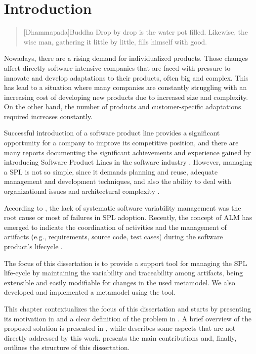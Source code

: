 \chapter{Introduction}
\label{ch:introduction}

\begin{quotation}[Dhammapada]{Buddha}
Drop by drop is the water pot filled. Likewise, the wise man, gathering it little by little, fills himself with good.
\end{quotation}

Nowadays, there are a rising demand for individualized products. Those changes affect directly software-intensive companies that are faced with pressure to innovate and develop adaptations to their products, often big and complex. This has lead to a situation where many companies are constantly struggling with an increasing cost of developing new products due to increased size and complexity. On the other hand, the number of products and customer-specific adaptations required increases constantly. \citep{rafael2013systems}

Successful introduction of a software product line provides a significant opportunity for a company to improve its competitive position, and there are many reports documenting the significant achievements and experience gained by introducing Software Product Lines in the software industry \citep{Pohl2005}. However, managing a \acf{SPL} is not so simple, since it demands planning and reuse, adequate management and development techniques, and also the ability to deal with organizational issues and architectural complexity \citep{CavalcantiInTech2012}. 

According to \citet{rafael2013systems} , the lack of systematic software variability management was the root cause or most of failures in \acf{SPL} adoption. Recently, the concept of \acf{ALM} has emerged to indicate the coordination of activities and the management of artifacts (e.g., requirements, source code, test cases) during the software product's lifecycle \citep{Schwaber2006}. 

The focus of this dissertation is to provide a support tool for managing the \acf{SPL} life-cycle by maintaining the variability and traceability among artifacts, being extensible and easily modifiable for changes in the used metamodel. We also developed and implemented a metamodel using the tool.


This chapter contextualizes the focus of this dissertation and starts by presenting its
motivation in   and a clear definition of the problem in . A brief overview of the proposed solution is presented in , while  describes some aspects that are not directly addressed by this work.
 presents the main contributions and, finally,
 outlines the structure of this dissertation.






